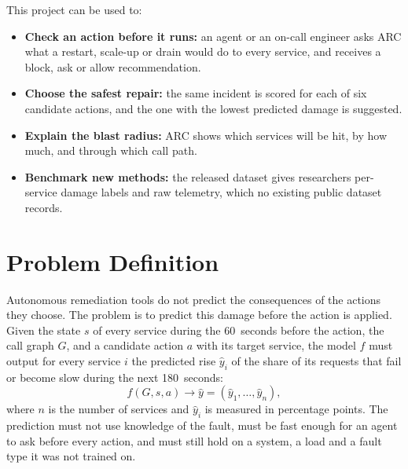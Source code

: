 \documentclass[12pt,a4paper]{report}
\begin{document}
\noindent This project can be used to:
\begin{itemize}
\item \textbf{Check an action before it runs:} an agent or an on-call engineer asks ARC what a restart, scale-up or drain would do to every service, and receives a block, ask or allow recommendation.
\item \textbf{Choose the safest repair:} the same incident is scored for each of six candidate actions, and the one with the lowest predicted damage is suggested.
\item \textbf{Explain the blast radius:} ARC shows which services will be hit, by how much, and through which call path.
\item \textbf{Benchmark new methods:} the released dataset gives researchers per-service damage labels and raw telemetry, which no existing public dataset records.
\end{itemize}

\section{Problem Definition}
Autonomous remediation tools do not predict the consequences of the actions they choose. The problem is to predict this damage before the action is applied. Given the state $s$ of every service during the 60~seconds before the action, the call graph $G$, and a candidate action $a$ with its target service, the model $f$ must output for every service $i$ the predicted rise $\hat{y}_i$ of the share of its requests that fail or become slow during the next 180~seconds:
\[
f(G, s, a) \rightarrow \hat{y} = (\hat{y}_1, \ldots, \hat{y}_n),
\]
where $n$ is the number of services and $\hat{y}_i$ is measured in percentage points. The prediction must not use knowledge of the fault, must be fast enough for an agent to ask before every action, and must still hold on a system, a load and a fault type it was not trained on.
\end{document}
